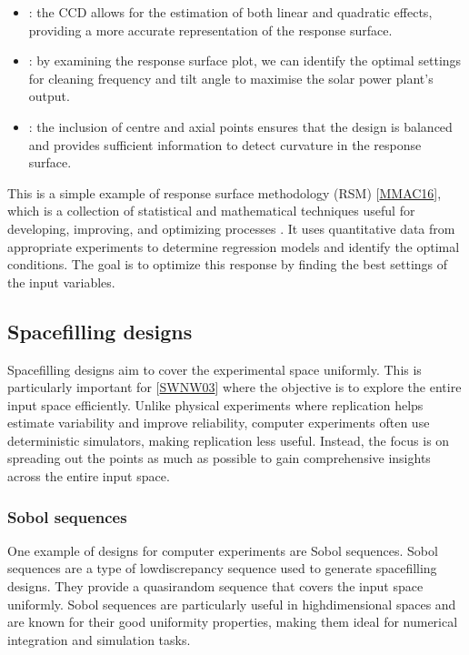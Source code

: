 \documentclass[letterpaper,10pt,english]{jupyterBook}
\begin{document}
\begin{itemize}
\item {} 
\sphinxAtStartPar
{}: the CCD allows for the estimation of both linear and quadratic effects, providing a more accurate representation of the response surface.

\item {} 
\sphinxAtStartPar
{}: by examining the response surface plot, we can identify the optimal settings for cleaning frequency and tilt angle to maximise the solar power plant’s output.

\item {} 
\sphinxAtStartPar
{}: the inclusion of centre and axial points ensures that the design is balanced and provides sufficient information to detect curvature in the response surface.

\end{itemize}

\sphinxAtStartPar
This is a simple example of response surface methodology (RSM) {[}\hyperlink{cite.bibliography:id17}{MMAC16}{]}, which is a collection of statistical and mathematical techniques useful for developing, improving, and optimizing processes . It uses quantitative data from appropriate experiments to determine regression models and identify the optimal conditions. The goal is to optimize this response by finding the best settings of the input variables.


\subsection{Space\sphinxhyphen{}filling designs}
\label{\detokenize{notebooks/design_of_experiments:space-filling-designs}}
\sphinxAtStartPar
Space\sphinxhyphen{}filling designs aim to cover the experimental space uniformly. This is particularly important for  {[}\hyperlink{cite.bibliography:id18}{SWNW03}{]} where the objective is to explore the entire input space efficiently. Unlike physical experiments where replication helps estimate variability and improve reliability, computer experiments often use deterministic simulators, making replication less useful. Instead, the focus is on spreading out the points as much as possible to gain comprehensive insights across the entire input space.


\subsubsection{Sobol sequences}
\label{\detokenize{notebooks/design_of_experiments:sobol-sequences}}
\sphinxAtStartPar
One example of designs for computer experiments are Sobol sequences. Sobol sequences are a type of low\sphinxhyphen{}discrepancy sequence used to generate space\sphinxhyphen{}filling designs. They provide a quasi\sphinxhyphen{}random sequence that covers the input space uniformly. Sobol sequences are particularly useful in high\sphinxhyphen{}dimensional spaces and are known for their good uniformity properties, making them ideal for numerical integration and simulation tasks.
\end{document}
